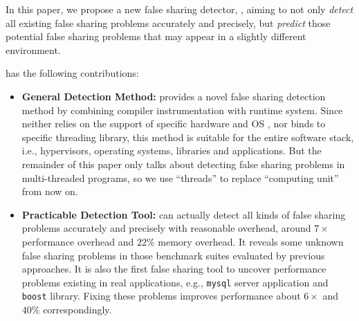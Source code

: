 In this paper, we propose a new false sharing detector, , aiming to
not only {\it detect} all existing false sharing problems accurately and precisely,
but {\it predict} those potential 
false sharing problems that may appear in a slightly different environment. 

\Defaults{} has the following contributions:
\begin{itemize}
\item
\textbf{General Detection Method:} provides a novel false sharing detection method by
combining compiler instrumentation with runtime system.
Since  neither relies on the support of specific hardware and OS ,
nor binds to specific threading library, 
this method is suitable for the entire software stack, 
i.e., hypervisors, operating systems, libraries and applications.
But the remainder of this paper only talks about detecting false sharing problems in multi-threaded 
programs, so we use ``threads'' to replace ``computing unit'' from now on.

\item
\textbf{Practicable Detection Tool:}  can actually detect all kinds of false sharing 
problems accurately and precisely 
with reasonable overhead, around $7\times$ performance overhead and $22\%$ memory overhead. 
It reveals some unknown false sharing problems in those benchmark suites evaluated by 
previous approaches.
It is also the first false sharing tool to uncover performance problems existing in real applications, e.g.,
\texttt{mysql} server application and \texttt{boost} library. Fixing these problems 
improves performance about $6\times$ and $40\%$ correspondingly.


\end{itemize}

